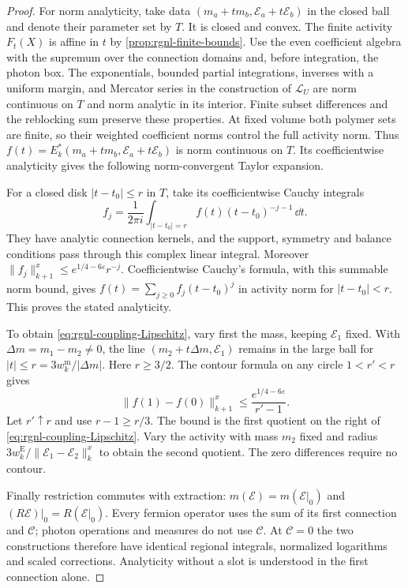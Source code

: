 \begin{proof}
For norm analyticity, take data
$(m_a+t m_b,\mathscr E_a+t\mathscr E_b)$ in the closed
ball and denote their parameter set by $T$.
It is closed and convex. The finite activity $F_t(X)$
is affine in $t$ by \cref{prop:rgnl-finite-bounds}.
Use the even coefficient algebra with the supremum over the
connection domains and, before integration, the photon box.
The exponentials, bounded partial integrations, inverses with a
uniform margin, and Mercator series in the construction of
$\mathcal L_U$ are norm continuous on $T$ and norm analytic in its
interior. Finite subset differences and the reblocking sum preserve
these properties. At fixed volume both polymer sets are finite,
so their weighted coefficient norms control the full activity norm.
Thus $f(t)=E_k^*(m_a+t m_b,\mathscr E_a+t\mathscr E_b)$ is norm
continuous on $T$. Its coefficientwise analyticity gives the following
norm-convergent Taylor expansion.

For a closed disk $|t-t_0|\le r$ in $T$, take its
coefficientwise Cauchy integrals
\[
 f_j=\frac1{2\pi i}\int_{|t-t_0|=r}
                             f(t)(t-t_0)^{-j-1}\,\dd t.
\]
They have analytic connection kernels, and the support,
symmetry and balance conditions pass through this
complex linear integral. Moreover
$\|f_j\|_{k+1}^x\le e^{1/4-6\varepsilon}r^{-j}$.
Coefficientwise Cauchy's formula, with this summable
norm bound, gives
$f(t)=\sum_{j\ge0}f_j(t-t_0)^j$ in activity norm for
$|t-t_0|<r$. This proves the stated analyticity.

To obtain \eqref{eq:rgnl-coupling-Lipschitz}, vary first
the mass, keeping $\mathscr E_1$ fixed. With
$\Delta m=m_1-m_2\ne0$, the line
$(m_2+t\Delta m,\mathscr E_1)$ remains in the large
ball for $|t|\le r=3w_k^{\mathrm m}/|\Delta m|$.
Here $r\ge3/2$. The contour formula on any circle
$1<r'<r$ gives
\[
 \|f(1)-f(0)\|_{k+1}^x
        \le\frac{e^{1/4-6\varepsilon}}{r'-1}.
\]
Let $r'\uparrow r$ and use $r-1\ge r/3$.
The bound is the first quotient on the right of
\eqref{eq:rgnl-coupling-Lipschitz}.
Vary the activity with mass $m_2$ fixed and radius
$3w_k^{\mathrm E}/\|\mathscr E_1-\mathscr E_2\|_k^x$
to obtain the second quotient.
The zero differences require no contour.

Finally restriction commutes with extraction:
$m(\mathscr E)=m(\mathscr E|_0)$ and
$(R\mathscr E)|_0=R(\mathscr E|_0)$.
Every fermion operator uses the sum of its first
connection and $\mathscr C$; photon operations and
measures do not use $\mathscr C$.
At $\mathscr C=0$ the two constructions therefore have
identical regional integrals, normalized logarithms and
scaled corrections. Analyticity without a slot is
understood in the first connection alone.
\end{proof}


